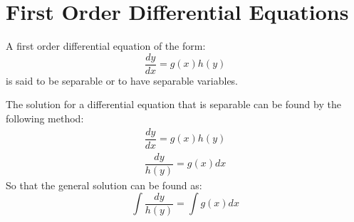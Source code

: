 \section{First Order Differential Equations}
\begin{define}
A first order differential equation of the form:
\begin{equation}
\dfrac{dy}{dx} = g(x)h(y)
\end{equation}
is said to be separable or to have separable variables.
\end{define}
\begin{thm}
The solution for a differential equation that is separable can be found by the following method:
\begin{align*}
\dfrac{dy}{dx} = g(x)h(y) \\
\dfrac{dy}{h(y)} = g(x)dx
\end{align*}
So that the general solution can be found as:
\begin{equation}
\int \dfrac{dy}{h(y)} = \int g(x) dx
\end{equation}
\end{thm}

